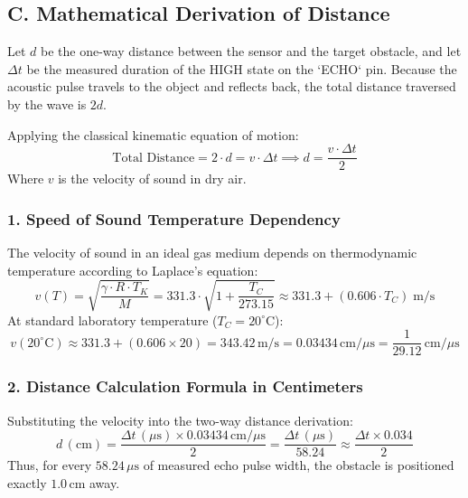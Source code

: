 \documentclass[10pt,a4paper]{article}
\begin{document}
\newpage

\subsection*{C. Mathematical Derivation of Distance}
Let $d$ be the one-way distance between the sensor and the target obstacle, and let $\Delta t$ be the measured duration of the HIGH state on the `ECHO` pin. Because the acoustic pulse travels to the object and reflects back, the total distance traversed by the wave is $2d$.

Applying the classical kinematic equation of motion:
\begin{equation}
\text{Total Distance} = 2 \cdot d = v \cdot \Delta t \implies d = \frac{v \cdot \Delta t}{2}
\end{equation}
Where $v$ is the velocity of sound in dry air.

\subsubsection*{1. Speed of Sound Temperature Dependency}
The velocity of sound in an ideal gas medium depends on thermodynamic temperature according to Laplace's equation:
\begin{equation}
v(T) = \sqrt{\frac{\gamma \cdot R \cdot T_K}{M}} = 331.3 \cdot \sqrt{1 + \frac{T_C}{273.15}} \approx 331.3 + (0.606 \cdot T_C)\;\text{m/s}
\end{equation}
At standard laboratory temperature ($T_C = 20^\circ\text{C}$):
\begin{equation}
v(20^\circ\text{C}) \approx 331.3 + (0.606 \times 20) = 343.42\,\text{m/s} = 0.03434\,\text{cm}/\mu\text{s} = \frac{1}{29.12}\,\text{cm}/\mu\text{s}
\end{equation}

\subsubsection*{2. Distance Calculation Formula in Centimeters}
Substituting the velocity into the two-way distance derivation:
\begin{equation}
d\,(\text{cm}) = \frac{\Delta t\,(\mu\text{s}) \times 0.03434\,\text{cm}/\mu\text{s}}{2} = \frac{\Delta t\,(\mu\text{s})}{58.24} \approx \frac{\Delta t \times 0.034}{2}
\end{equation}
Thus, for every $58.24\,\mu\text{s}$ of measured echo pulse width, the obstacle is positioned exactly $1.0\,\text{cm}$ away.
\end{document}
